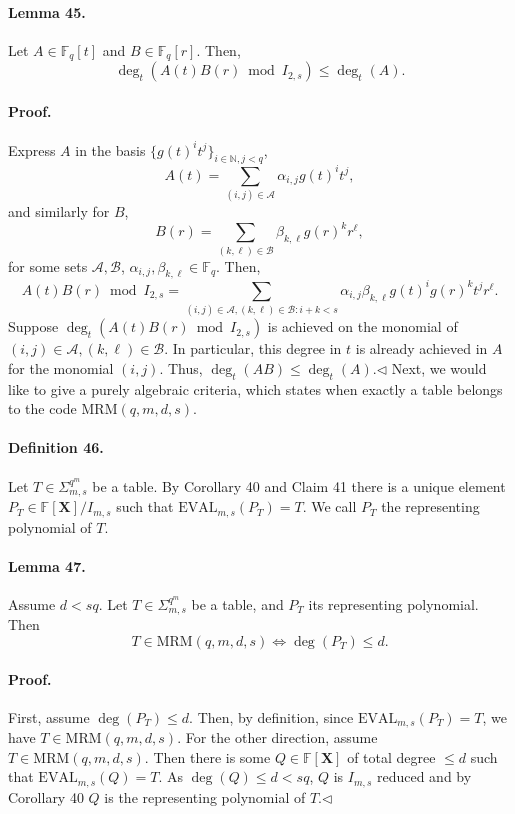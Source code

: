 \paragraph{Lemma 45.} Let $A\in\mathbb F_q[t]$ and $B\in\mathbb F_q[r]$. Then,
\[\deg_t(A(t)B(r)\bmod I_{2,s})\leq\deg_t(A).\]
\paragraph{Proof.} Express $A$ in the basis $\{g(t)^it^j\}_{i\in\mathbb N,j<q}$,
\[A(t)=\sum_{(i,j)\in\mathcal A}\alpha_{i,j}g(t)^it^j,\]
and similarly for $B$,
\[B(r)=\sum_{(k,\ell)\in\mathcal B}\beta_{k,\ell}g(r)^kr^\ell,\]
for some sets $\mathcal A,\mathcal B$, $\alpha_{i,j},\beta_{k,\ell}\in\mathbb F_q$. Then,
\[A(t)B(r)\bmod I_{2,s}=\sum_{(i,j)\in\mathcal A,(k,\ell)\in\mathcal B:i+k<s}\alpha_{i,j}\beta_{k,\ell}g(t)^ig(r)^kt^jr^\ell.\]
Suppose $\deg_t(A(t)B(r)\bmod I_{2,s})$ is achieved on the monomial of $(i,j)\in\mathcal A,(k,\ell)\in\mathcal B$. In particular, this degree in $t$ is already achieved in $A$ for the monomial $(i,j)$. Thus, $\deg_t(AB)\leq\deg_t(A)$.\hfill$\triangleleft$
Next, we would like to give a purely algebraic criteria, which states when exactly a table belongs to the code $\mathrm{MRM}(q,m,d,s)$.
\paragraph{Definition 46.} Let $T\in\Sigma_{m,s}^{q^m}$ be a table. By Corollary 40 and Claim 41 there is a unique element $P_T\in\mathbb F[\boldsymbol X]/I_{m,s}$ such that $\mathrm{EVAL}_{m,s}(P_T)=T$. We call $P_T$ the representing polynomial of $T$.
\paragraph{Lemma 47.} Assume $d<sq$. Let $T\in\Sigma_{m,s}^{q^m}$ be a table, and $P_T$ its representing polynomial. Then
\[T\in\mathrm{MRM}(q,m,d,s)\Longleftrightarrow\deg(P_T)\leq d.\]
\paragraph{Proof.} First, assume $\deg(P_T)\leq d$. Then, by definition, since $\mathrm{EVAL}_{m,s}(P_T)=T$, we have $T\in\mathrm{MRM}(q,m,d,s)$. For the other direction, assume $T\in\mathrm{MRM}(q,m,d,s)$. Then there is some $Q\in\mathbb F[\boldsymbol X]$ of total degree $\leq d$ such that $\mathrm{EVAL}_{m,s}(Q)=T$. As $\deg(Q)\leq d<sq$, $Q$ is $I_{m,s}$ reduced and by Corollary 40 $Q$ is the representing polynomial of $T$.\hfill$\triangleleft$
